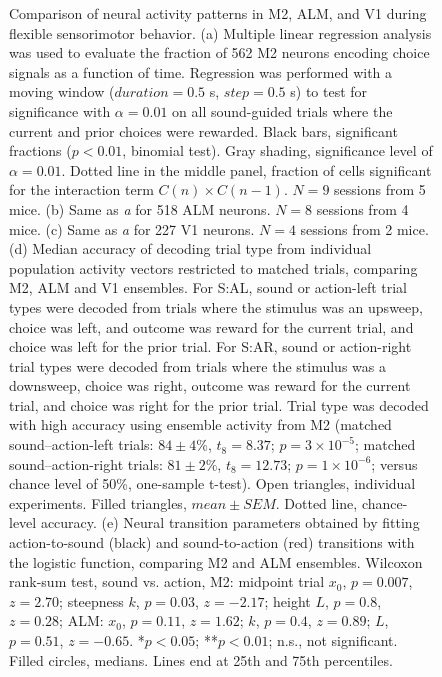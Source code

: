 \begin{figure}[htbp]
\caption[Comparison of neural activity patterns in M2, ALM, and V1]
{
Comparison of neural activity patterns in M2, ALM, and V1 during flexible sensorimotor behavior.
(a) Multiple linear regression analysis was used to evaluate the fraction of 562 M2 neurons encoding choice signals as a function of time. Regression was performed with a moving window ($\mathit{duration} = 0.5$ s, $\mathit{step} = 0.5$ s) to test for significance with $\alpha = 0.01$ on all sound-guided trials where the current and prior choices were rewarded. Black bars, significant fractions ($p < 0.01$, binomial test). Gray shading, significance level of $\alpha=0.01$. Dotted line in the middle panel, fraction of cells significant for the interaction term $C(n) \times C(n-1)$. $N = 9$ sessions from 5 mice. (b) Same as \emph{a} for 518 ALM neurons. $N = 8$ sessions from 4 mice. (c) Same as \emph{a} for 227 V1 neurons. $N = 4$ sessions from 2 mice. (d) Median accuracy of decoding trial type from individual population activity vectors restricted to matched trials, comparing M2, ALM and V1 ensembles. For S:AL, sound or action-left trial types were decoded from trials where the stimulus was an upsweep, choice was left, and outcome was reward for the current trial, and choice was left for the prior trial. For S:AR, sound or action-right trial types were decoded from trials where the stimulus was a downsweep, choice was right, outcome was reward for the current trial, and choice was right for the prior trial. Trial type was decoded with high accuracy using ensemble activity from M2 (matched sound--action-left trials: $84 \pm 4\%$, $t_8 = 8.37$; $p = 3 \times 10^{-5}$; matched sound--action-right trials: $81 \pm 2\%$, $t_8 = 12.73$; $p = 1 \times 10^{-6}$; versus chance level of 50\%, one-sample t-test). Open triangles, individual experiments. Filled triangles, $\mathit{mean}\pm\mathit{SEM}$. Dotted line, chance-level accuracy. (e) Neural transition parameters obtained by fitting action-to-sound (black) and sound-to-action (red) transitions with the logistic function, comparing M2 and ALM ensembles. Wilcoxon rank-sum test, sound vs. action, M2: midpoint trial $x_0$, $p = 0.007$, $z = 2.70$; steepness $k$, $p = 0.03$, $z = -2.17$; height $L$, $p = 0.8$, $z = 0.28$; ALM: $x_0$, $p = 0.11$, $z = 1.62$; $k$, $p = 0.4$, $z = 0.89$; $L$, $p = 0.51$, $z = -0.65$. *$p < 0.05$; **$p < 0.01$; n.s., not significant. Filled circles, medians. Lines end at 25th and 75th percentiles.
}

\label{fig:NN_fig7}
\end{figure}